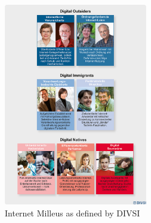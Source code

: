 \begin{figure}[hHtbp]
\centering
\includegraphics[width=0.56\textwidth]{graphix/DIVSI-Milieus.jpg}
\caption{Internet Milleus as defined by DIVSI}
\label{fig:divsi_milieus}
\end{figure}

